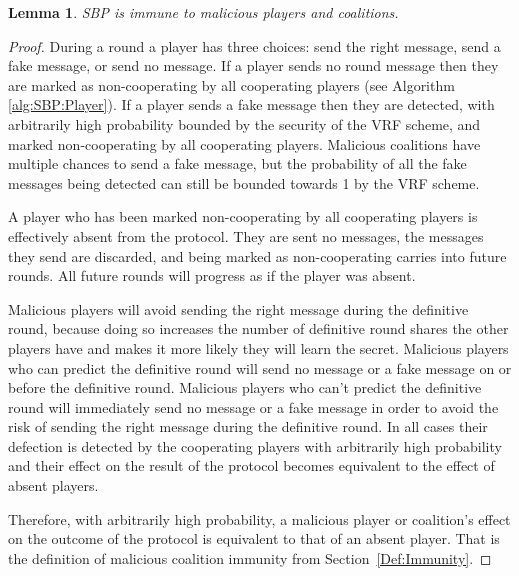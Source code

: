 \documentclass[12pt]{dalcsthesis}
\newtheorem{lemma}{Lemma}
\begin{document}
\begin{lemma}\label{Lem:SBPMalImmune}SBP is immune to malicious players and coalitions.\end{lemma}
\begin{proof}
During a round a player has three choices: send the right message, send a fake message, or send no message. If a player sends no round message then they are marked as non-cooperating by all cooperating players (see Algorithm \ref{alg:SBP:Player}). If a player sends a fake message then they are detected, with arbitrarily high probability bounded by the security of the VRF scheme, and marked non-cooperating by all cooperating players. Malicious coalitions have multiple chances to send a fake message, but the probability of all the fake messages being detected can still be bounded towards 1 by the VRF scheme. 

A player who has been marked non-cooperating by all cooperating players is effectively absent from the protocol. They are sent no messages, the messages they send are discarded, and being marked as non-cooperating carries into future rounds. All future rounds will progress as if the player was absent.

Malicious players will avoid sending the right message during the definitive round, because doing so increases the number of definitive round shares the other players have and makes it more likely they will learn the secret. Malicious players who can predict the definitive round will send no message or a fake message on or before the definitive round. Malicious players who can't predict the definitive round will immediately send no message or a fake message in order to avoid the risk of sending the right message during the definitive round. In all cases their defection is detected by the cooperating players with arbitrarily high probability and their effect on the result of the protocol becomes equivalent to the effect of absent players.

Therefore, with arbitrarily high probability, a malicious player or coalition's effect on the outcome of the protocol is equivalent to that of an absent player. That is the definition of malicious coalition immunity from Section~\ref{Def:Immunity}.
\end{proof}
\end{document}
